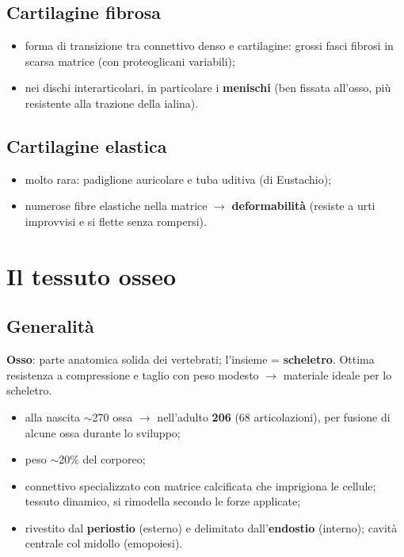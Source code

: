 \subsection{Cartilagine fibrosa}
\begin{itemize}
  \item forma di transizione tra connettivo denso e cartilagine: grossi fasci fibrosi in scarsa
    matrice (con proteoglicani variabili);
  \item nei dischi interarticolari, in particolare i \textbf{menischi} (ben fissata all'osso, più
    resistente alla trazione della ialina).
\end{itemize}

\subsection{Cartilagine elastica}
\begin{itemize}
  \item molto rara: padiglione auricolare e tuba uditiva (di Eustachio);
  \item numerose fibre elastiche nella matrice $\rightarrow$ \textbf{deformabilità} (resiste a urti
    improvvisi e si flette senza rompersi).
\end{itemize}

\section{Il tessuto osseo}

\subsection{Generalità}
\textbf{Osso}: parte anatomica solida dei vertebrati; l'insieme = \textbf{scheletro}. Ottima
resistenza a compressione e taglio con peso modesto $\rightarrow$ materiale ideale per lo scheletro.
\begin{itemize}
  \item alla nascita $\sim$270 ossa $\rightarrow$ nell'adulto \textbf{206} (68 articolazioni), per
    fusione di alcune ossa durante lo sviluppo;
  \item peso $\sim$20\% del corporeo;
  \item connettivo specializzato con matrice calcificata che imprigiona le cellule; tessuto
    dinamico, si rimodella secondo le forze applicate;
  \item rivestito dal \textbf{periostio} (esterno) e delimitato dall'\textbf{endostio} (interno);
    cavità centrale col midollo (emopoiesi).
\end{itemize}

